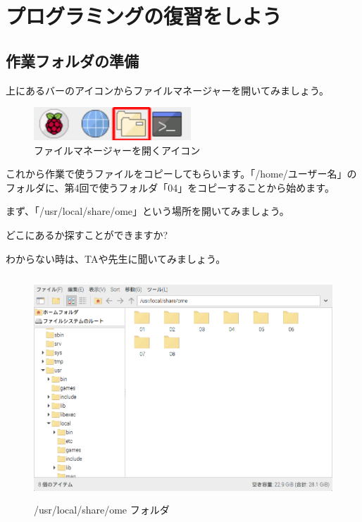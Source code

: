 

\section{プログラミングの復習をしよう}

\subsection{作業フォルダの準備}
\bigskip
\bigskip

上にあるバーのアイコンからファイルマネージャーを開いてみましょう。


\begin{figure}[H]
  \begin{center}
    \includegraphics[keepaspectratio,width=5.898cm,height=1.242cm]{text04-img/text02-img001.png}
    \caption{ファイルマネージャーを開くアイコン}
  \end{center}
  \label{fig:prog_menu}
\end{figure}

これから作業で使うファイルをコピーしてもらいます。「/home/ユーザー名」のフォルダに、第4回で使うフォルダ「04」をコピーすることから始めます。

まず、「/usr/local/share/ome」という場所を開いてみましょう。

どこにあるか探すことができますか?

わからない時は、TAや先生に聞いてみましょう。


\begin{figure}[H]
  \begin{center}
    \includegraphics[keepaspectratio,width=11.232cm,height=8.424cm]{text04-img/s_ome04a.png}
    \caption{/usr/local/share/ome フォルダ}
  \end{center}
  \label{fig:prog_menu}
\end{figure}

